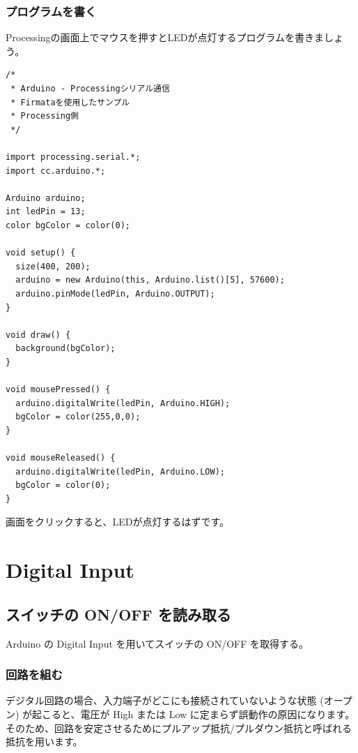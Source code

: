 \documentclass[11pt,a4paper]{jarticle}
\begin{document}
\subsubsection*{プログラムを書く}
Processingの画面上でマウスを押すとLEDが点灯するプログラムを書きましょう。
\begin{lstlisting}
/*
 * Arduino - Processingシリアル通信
 * Firmataを使用したサンプル
 * Processing側
 */
 
import processing.serial.*;
import cc.arduino.*;
 
Arduino arduino;
int ledPin = 13;
color bgColor = color(0);
 
void setup() {
  size(400, 200);
  arduino = new Arduino(this, Arduino.list()[5], 57600);
  arduino.pinMode(ledPin, Arduino.OUTPUT);
}
 
void draw() {
  background(bgColor);
}
 
void mousePressed() {
  arduino.digitalWrite(ledPin, Arduino.HIGH);
  bgColor = color(255,0,0);
}
 
void mouseReleased() {
  arduino.digitalWrite(ledPin, Arduino.LOW);
  bgColor = color(0);
}
\end{lstlisting}
画面をクリックすると、LEDが点灯するはずです。

\section{Digital Input}
\subsection*{スイッチの ON/OFF を読み取る}
Arduino の Digital Input を用いてスイッチの ON/OFF を取得する。

\subsubsection*{回路を組む}
デジタル回路の場合、入力端子がどこにも接続されていないような状態 (オープン) が起こると、電圧が High または Low に定まらず誤動作の原因になります。
そのため、回路を安定させるためにプルアップ抵抗/プルダウン抵抗と呼ばれる抵抗を用います。
\end{document}
